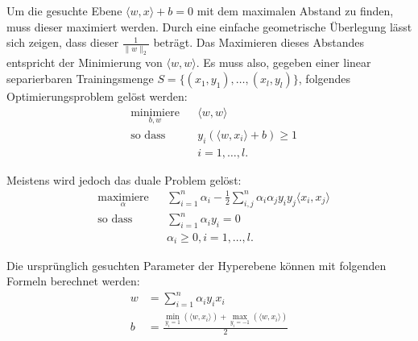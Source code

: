 \documentclass[ngerman]{scrartcl}
\begin{document}
Um die gesuchte Ebene $\langle w,x \rangle + b = 0$ mit dem maximalen Abstand zu finden, muss dieser maximiert werden.
Durch eine einfache geometrische Überlegung lässt sich zeigen, dass dieser $\frac{1}{\|w\|_2}$ beträgt. Das Maximieren dieses Abstandes entspricht der Minimierung von $\langle w,w \rangle$.
Es muss also, gegeben einer linear separierbaren Trainingsmenge $S = \lbrace(x_1, y_1),\ldots ,(x_l, y_l)\rbrace$, folgendes Optimierungsproblem gelöst werden:
\begin{align}
& \underset{b,w}{\text{minimiere}}& & \langle w,w \rangle \\
& \text{so dass } & & y_i \left( \langle w , x_i \rangle + b \right) \geq 1 \nonumber \\
& & &i = 1, \ldots, l. \nonumber
\end{align}

Meistens wird jedoch das duale Problem gelöst:
\begin{align}
&\underset{\alpha}{\text{maximiere}} && \sum_{i=1}^n \alpha_i - \frac{1}{2} \sum_{i,j}^n \alpha_i \alpha_j y_i y_j \langle x_i, x_j \rangle  \\
&\text{so dass } && \sum_{i=1}^n \alpha_i y_i = 0 \\
&&&  \alpha_i \geq 0, i = 1, \ldots  ,l.
\end{align}

Die ursprünglich gesuchten Parameter der Hyperebene können mit folgenden Formeln berechnet werden:
\begin{align}
w &= \sum_{i=1}^n \alpha_i y_i x_i \\
b &= \frac{\min_{y_i = 1}(\langle w,x_i \rangle ) + \max_{y_i = -1}(\langle w,x_i \rangle)}{2}
\end{align}
\end{document}
